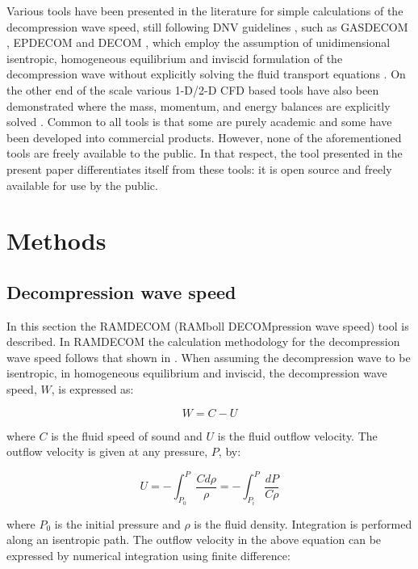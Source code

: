 \documentclass[a4paper, 10pt, twocolumn, twoside]{scrartcl}
\begin{document}
Various tools have been presented in the literature for simple calculations of the decompression wave speed, still following DNV guidelines \cite{dnv}, such as GASDECOM \cite{Cosham_GASDECOM}, EPDECOM \cite{Lu2012_EPDECOM} and DECOM \cite{Cosham_DECOM}, which employ the assumption of unidimensional isentropic, homogeneous equilibrium and inviscid formulation of the decompression wave without explicitly
solving the fluid transport equations \cite{Liu_2017}. On the other end of the scale  various 1-D/2-D CFD based tools have also been demonstrated where the mass, momentum, and energy balances are explicitly solved \cite{Xu2014_CFDDECOM,OKE20034591_pipetech_CFD,ELSHAHOMI201520_CFD,Fang2019}. Common to all tools is that some are purely academic and some have been developed into commercial products. However, none of the aforementioned tools are freely available to the public. In that respect, the tool presented in the present paper differentiates itself from these tools: it is open source and freely available for use by the public. 

\section{Methods}

\subsection{Decompression wave speed}
In this section the RAMDECOM (RAMboll DECOMpression wave speed) tool is described. In RAMDECOM the calculation methodology for the decompression wave speed follows that shown in \cite{Hu2021,GU2018237}. When assuming the decompression wave to be isentropic, in  homogeneous equilibrium and inviscid, the decompression wave speed, $W$, is expressed as:

\begin{equation}\label{eqn:decompression}
W = C - U 
\end{equation}

where $C$ is the fluid speed of sound and $U$ is the fluid outflow velocity. The outflow velocity is given at any pressure, $P$, by:

\begin{equation}\label{eqn:outflow}
U = -\int_{P_0}^{P}{\frac{Cd\rho}{\rho}} = -\int_{P_i}^{P}{\frac{dP}{C\rho}}
\end{equation}

where $P_0$ is the initial pressure and $\rho$ is the fluid density. Integration is performed along an isentropic path. The outflow velocity in the above equation can be expressed by numerical integration using finite difference:
\end{document}
